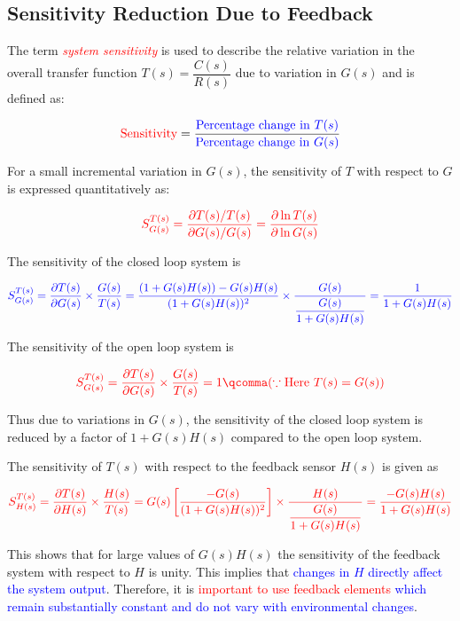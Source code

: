 \documentclass[
  14pt,
  a4paper,
  oneside,
  open=any,
  a4paper,
  14pt]{report}
\begin{document}
\subsection{Sensitivity Reduction Due to
Feedback}\label{sensitivity-reduction-due-to-feedback}

The term \textcolor{red}{\emph{system sensitivity}} is used to describe
the relative variation in the overall transfer function
\(T(s) = \dfrac{C(s)}{R(s)}\) due to variation in \(G(s)\) and is
defined as:

\[
    \textcolor{red}{\text{Sensitivity}} = \dfrac{\textcolor{blue}{\text{Percentage change in }T(s)}}{\textcolor{blue}{\text{Percentage change in }G(s)}}
\]

For a small incremental variation in \(G(s)\), the sensitivity of \(T\)
with respect to \(G\) is expressed quantitatively as:

\[
    \textcolor{red}{S^{T(s)}_{G(s)} = \pdv{T(s)/T(s)}{G(s)/G(s)} = \pdv{\ln{T(s)}}{\ln{G(s)}}}
\]

The sensitivity of the closed loop system is

\[
    \textcolor{blue}{S^{T(s)}_{G(s)} = \pdv{T(s)}{G(s)} \times \dfrac{G(s)}{T(s)} = \dfrac{(1+G(s)H(s))-G(s)H(s)}{(1+G(s)H(s))^2} \times \dfrac{G(s)}{\dfrac{G(s)}{1+G(s)H(s)}} = \dfrac{1}{1+G(s)H(s)}}
\]

The sensitivity of the open loop system is

\[
    \textcolor{red}{S^{T(s)}_{G(s)} = \pdv{T(s)}{G(s)} \times \dfrac{G(s)}{T(s)} = 1 \qcomma (\because \text{Here } T(s) = G(s))}
\]

Thus due to variations in \(G(s)\), the sensitivity of the closed loop
system is reduced by a factor of \(1+G(s)H(s)\) compared to the open
loop system.

The sensitivity of \(T(s)\) with respect to the feedback sensor \(H(s)\)
is given as

\[
    \textcolor{red}{S^{T(s)}_{H(s)} = \pdv{T(s)}{H(s)} \times \dfrac{H(s)}{T(s)} = G(s)\left[\dfrac{-G(s)}{(1+G(s)H(s))^2} \right] \times \dfrac{H(s)}{\dfrac{G(s)}{1+G(s)H(s)}} = \dfrac{-G(s)H(s)}{1+G(s)H(s)}}
\]

This shows that for large values of \(G(s)H(s)\) the sensitivity of the
feedback system with respect to \(H\) is unity. This implies that
\textcolor{blue}{changes in \(H\) directly affect the system output}.
Therefore, it is \textcolor{red}{important to use feedback elements}
\textcolor{blue}{which remain substantially constant and do not vary
with environmental changes}.
\end{document}
